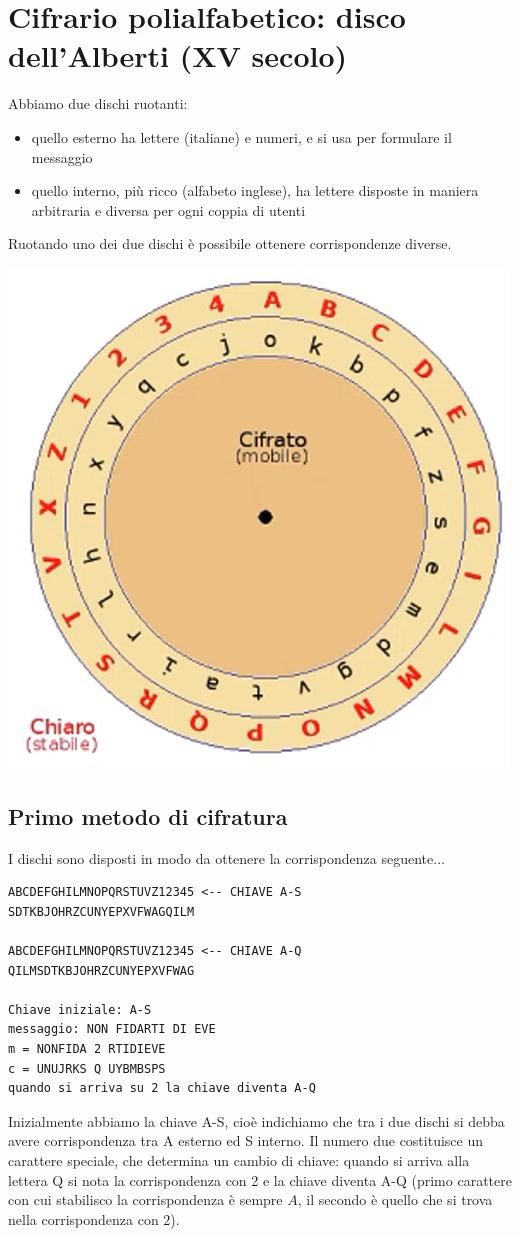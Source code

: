\section{Cifrario polialfabetico: disco dell'Alberti (XV secolo)}
Abbiamo due dischi ruotanti:
\begin{itemize}
	\item quello esterno ha lettere (italiane) e numeri, e si usa per formulare il messaggio
	\item quello interno, più ricco (alfabeto inglese), ha lettere disposte in maniera arbitraria e diversa per ogni coppia di utenti
\end{itemize}
Ruotando uno dei due dischi è possibile ottenere corrispondenze diverse.
\begin{center}
	\includegraphics[scale=.45]{images/8.PNG}
\end{center}
\subsection{Primo metodo di cifratura} I dischi sono disposti in modo da ottenere la corrispondenza seguente...
\begin{verbatim}
ABCDEFGHILMNOPQRSTUVZ12345 <-- CHIAVE A-S
SDTKBJOHRZCUNYEPXVFWAGQILM

ABCDEFGHILMNOPQRSTUVZ12345 <-- CHIAVE A-Q
QILMSDTKBJOHRZCUNYEPXVFWAG

Chiave iniziale: A-S
messaggio: NON FIDARTI DI EVE
m = NONFIDA 2 RTIDIEVE
c = UNUJRKS Q UYBMBSPS
quando si arriva su 2 la chiave diventa A-Q
\end{verbatim}
Inizialmente abbiamo la chiave A-S, cioè indichiamo che tra i due dischi si debba avere corrispondenza tra A esterno ed S interno. Il numero due costituisce un carattere speciale, che determina un cambio di chiave: quando si arriva alla lettera Q si nota la corrispondenza con 2 e la chiave diventa A-Q (primo carattere con cui stabilisco la corrispondenza è sempre $A$, il secondo è quello che si trova nella corrispondenza con $2$).

